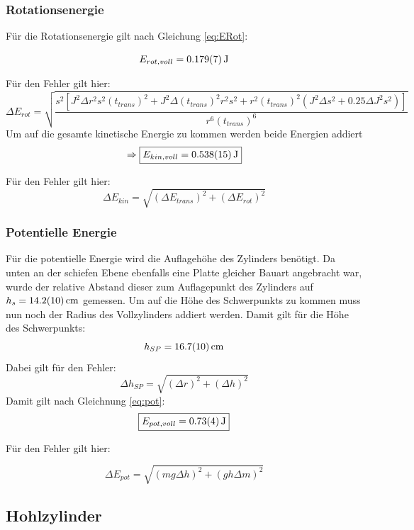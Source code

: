 \subsubsection{Rotationsenergie}

Für die Rotationsenergie gilt nach Gleichung \ref{eq:ERot}:

\[E_{rot,voll} = \SI{0,179 \pm 0,007}{\joule}\]

Für den Fehler gilt hier:
\[\Delta E_{rot}=\sqrt{\frac{s^{2} \left[J^{2} \Delta r^{2} s^{2} (t_{trans})^{2} + J^{2} \Delta (t_{trans})^{2} r^{2} s^{2} + r^{2} (t_{trans})^{2} \left(J^{2} \Delta s^{2} + 0.25 \Delta J^{2} s^{2}\right)\right]}{r^{6} (t_{trans})^{6}}}\]
Um auf die gesamte kinetische Energie zu kommen werden beide Energien addiert
\[\Rightarrow \boxed{E_{kin, voll} = \SI{0,538 \pm 0,015}{\joule}}\]

Für den Fehler gilt hier:
\begin{equation}
    \Delta E_{kin} = \sqrt{(\Delta E_{trans})^2 + (\Delta E_{rot})^2 }
\end{equation}

\subsubsection{Potentielle Energie}

Für die potentielle Energie wird die Auflagehöhe des Zylinders benötigt. Da unten an der schiefen Ebene ebenfalls eine Platte gleicher Bauart angebracht war,
wurde der relative Abstand dieser zum Auflagepunkt des Zylinders auf $h_s = \SI{14,2 \pm 1,0}{\cm}$ gemessen.
Um auf die Höhe des Schwerpunkts zu kommen muss nun noch der Radius des Vollzylinders addiert werden.
Damit gilt für die Höhe des Schwerpunkts:
\[h_{SP} = \SI{16,7 \pm 1,0}{\cm}\]
Dabei gilt für den Fehler:
\begin{equation}
    \Delta h_{SP} = \sqrt{(\Delta r)^2 + (\Delta h)^2}
\end{equation}
Damit gilt nach Gleichnung \ref{eq:pot}:
\[\boxed{E_{pot,voll} = \SI{0,73 \pm 0,04}{\joule}}\]

Für den Fehler gilt hier:

\begin{equation}
    \Delta E_{pot} = \sqrt{(mg\Delta h)^2 + (gh\Delta m)^2}
\end{equation}

\subsection{Hohlzylinder}


